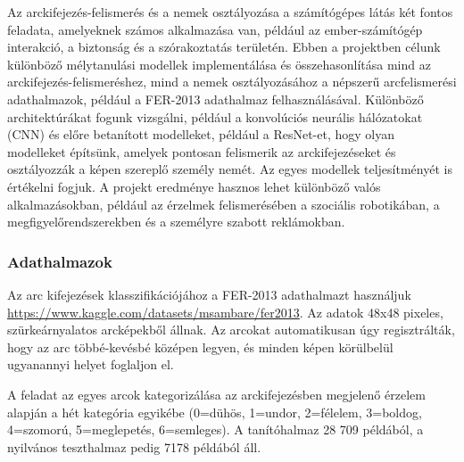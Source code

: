 \documentclass[12pt,a4]{article}
\begin{document}
            Az arckifejezés-felismerés és a nemek osztályozása a számítógépes látás két fontos feladata, amelyeknek számos alkalmazása van, például az ember-számítógép interakció, a biztonság és a szórakoztatás területén. Ebben a projektben célunk különböző mélytanulási modellek implementálása és összehasonlítása mind az arckifejezés-felismeréshez, mind a nemek osztályozásához a népszerű arcfelismerési adathalmazok, például a FER-2013 adathalmaz felhasználásával. Különböző architektúrákat fogunk vizsgálni, például a konvolúciós neurális hálózatokat (CNN) és előre betanított modelleket, például a ResNet-et, hogy olyan modelleket építsünk, amelyek pontosan felismerik az arckifejezéseket és osztályozzák a képen szereplő személy nemét. Az egyes modellek teljesítményét is értékelni fogjuk. A projekt eredménye hasznos lehet különböző valós alkalmazásokban, például az érzelmek felismerésében a szociális robotikában, a megfigyelőrendszerekben és a személyre szabott reklámokban.
        
            \subsubsection{Adathalmazok}
                Az arc kifejezések klasszifikációjához a FER-2013 adathalmazt használjuk \url{https://www.kaggle.com/datasets/msambare/fer2013}. Az adatok 48x48 pixeles, szürkeárnyalatos arcképekből állnak. Az arcokat automatikusan úgy regisztrálták, hogy az arc többé-kevésbé középen legyen, és minden képen körülbelül ugyanannyi helyet foglaljon el.
                
                A feladat az egyes arcok kategorizálása az arckifejezésben megjelenő érzelem alapján a hét kategória egyikébe (0=dühös, 1=undor, 2=félelem, 3=boldog, 4=szomorú, 5=meglepetés, 6=semleges). A tanítóhalmaz 28 709 példából, a nyilvános teszthalmaz pedig 7178 példából áll.
                
\end{document}
